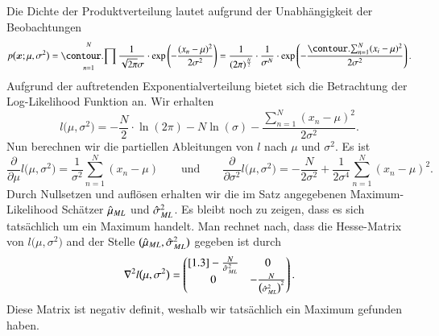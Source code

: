 \begin{frame}{}{}
	\begin{myproof}
		Die Dichte der Produktverteilung lautet aufgrund der Unabhängigkeit der Beobachtungen
		\begin{equation*}
			p\bigl( \bx; \mu, \sigma^2 \bigr)
				= \prod_{n=1}^N \frac{1}{\sqrt{2 \pi} \sigma} \cdot \exp\left( -\frac{(x_n - \mu)^2}{2 \sigma^2} \right)
				= \frac{1}{(2 \pi)^{\frac{N}{2}}} \cdot \frac{1}{\sigma^N}
					\cdot \exp\left( -\frac{\sum_{n=1}^N (x_i - \mu)^2}{2 \sigma^2} \right).
		\end{equation*}
		Aufgrund der auftretenden Exponentialverteilung bietet sich die Betrachtung der Log-Likelihood Funktion an.
		Wir erhalten
		\begin{equation*}
			l\bigl( \mu, \sigma^2 \bigr)
				= -\frac{N}{2} \cdot \ln(2 \pi) - N \ln(\sigma) - \frac{\sum_{n=1}^N (x_n - \mu)^2}{2 \sigma^2}.
		\end{equation*}
		Nun berechnen wir die partiellen Ableitungen von $l$ nach $\mu$ und $\sigma^2$. Es ist
		\begin{equation*}
			\frac{\partial}{\partial \mu} l\bigl( \mu, \sigma^2 \bigr)
				= \frac{1}{\sigma^2} \sum_{n=1}^N (x_n - \mu)
		\qquad\text{und}\qquad
			\frac{\partial}{\partial \sigma^2} l\bigl( \mu, \sigma^2 \bigr)
				= -\frac{N}{2 \sigma^2} + \frac{1}{2 \sigma^4} \sum_{n=1}^N (x_n - \mu)^2.
		\end{equation*}
		Durch Nullsetzen und auflösen erhalten wir die im Satz angegebenen Maximum-Likelihood Schätzer
		$\hat{\mu}_{ML}$ und $\hat{\sigma}^2_{ML}$.
		Es bleibt noch zu zeigen, dass es sich tatsächlich um ein Maximum handelt. Man rechnet nach,
		dass die Hesse-Matrix von $l\bigl( \mu, \sigma^2 \bigr)$ and der Stelle $\bigl( \hat{\mu}_{ML}, \hat{\sigma}^2_{ML} \bigr)$
		gegeben ist durch
		\begin{equation*}
			\nabla^2 l\bigl( \mu, \sigma^2 \bigr) =
			\begin{pmatrix}[1.3] -\frac{N}{\hat{\sigma}^2_{ML}} & 0 \\ 0 & -\frac{N}{\bigl( \hat{\sigma}^2_{ML} \bigr)^2} \end{pmatrix}.
		\end{equation*}
		Diese Matrix ist negativ definit, weshalb wir tatsächlich ein Maximum gefunden haben.
	\end{myproof}
\end{frame}


